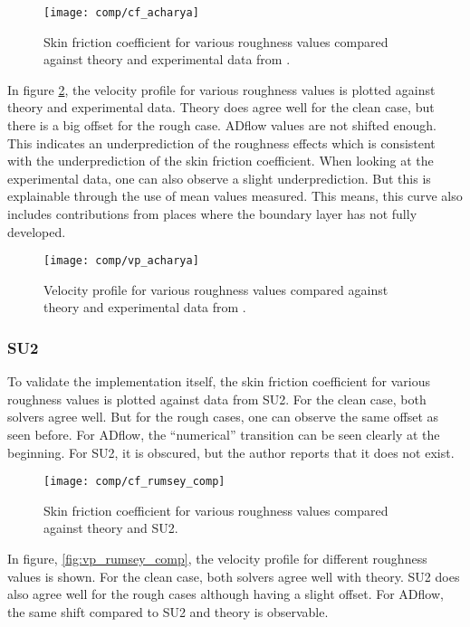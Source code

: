 \begin{figure}[H] \centering
  \texttt{[image: comp/cf\_acharya]}
    \caption{Skin friction coefficient for various roughness values compared
      against theory and experimental data from \cite{Acharya1986}.}
    \label{fig:cf_acharya}
\end{figure}

\noindent In figure \ref{fig:vp_acharya}, the velocity profile for various
roughness values is plotted against theory and experimental data. Theory does
agree well for the clean case, but there is a big offset for the rough case.
ADflow values are not shifted enough. This indicates an underprediction of the
roughness effects which is consistent with the underprediction of the skin
friction coefficient. When looking at the experimental data, one can also
observe a slight underprediction. But this is explainable through the use of
mean values measured. This means, this curve also includes contributions from
places where the boundary layer has not fully developed.

\begin{figure}[H] \centering
  \texttt{[image: comp/vp\_acharya]}
    \caption{Velocity profile for various roughness values compared
      against theory and experimental data from \cite{Acharya1986}.}
    \label{fig:vp_acharya}
\end{figure}



\subsubsection{SU2}
To validate the implementation itself, the skin friction coefficient for various
roughness values is plotted against data from SU2. For the clean case, both
solvers agree well. But for the rough cases, one can observe the same offset as
seen before. For ADflow, the ``numerical'' transition can be seen clearly at the
beginning. For SU2, it is obscured, but the author reports that it does not
exist.

\begin{figure}[H] \centering
  \texttt{[image: comp/cf\_rumsey\_comp]}
    \caption{Skin friction coefficient for various roughness values compared
      against theory and SU2.}
    \label{fig:cf_rumsey_comp}
\end{figure}

\noindent In figure, \ref{fig:vp_rumsey_comp}, the velocity profile for
different roughness values is shown. For the clean case, both solvers agree well
with theory. SU2 does also agree well for the rough cases although having a
slight offset. For ADflow, the same shift compared to SU2 and theory is
observable.

